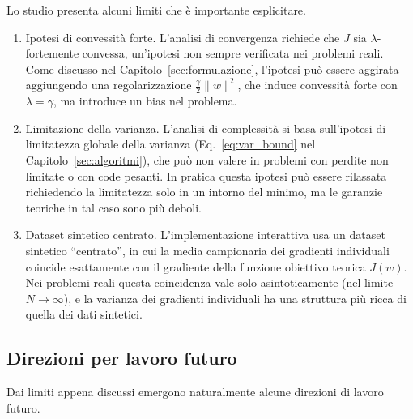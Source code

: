 \documentclass[a4paper,12pt]{article}
\numberwithin{equation}{section}
\numberwithin{figure}{section}
\numberwithin{table}{section}
\begin{document}
Lo studio presenta alcuni limiti che è importante esplicitare.

\begin{enumerate}\setlength{\itemsep}{1pt}\setlength{\topsep}{3pt}\setlength{\parskip}{0pt}
  \item Ipotesi di convessità forte. L'analisi di convergenza richiede
  che $J$ sia $\lambda$-fortemente convessa, un'ipotesi non sempre verificata
  nei problemi reali. Come discusso
  nel Capitolo~\ref{sec:formulazione}, l'ipotesi può essere aggirata
  aggiungendo una regolarizzazione $\frac{\gamma}{2}\|w\|^2$, che induce
  convessità forte con $\lambda = \gamma$, ma introduce un bias nel problema.
  \item Limitazione della varianza. L'analisi di complessità si basa
  sull'ipotesi di limitatezza globale della varianza
  (Eq.~\eqref{eq:var_bound} nel Capitolo~\ref{sec:algoritmi}), che può non
  valere in problemi con perdite non limitate o con code pesanti. In pratica
  questa ipotesi può essere rilassata richiedendo la limitatezza solo in un
  intorno del minimo, ma le garanzie teoriche in tal caso sono più deboli.
  \item Dataset sintetico centrato. L'implementazione interattiva usa
  un dataset sintetico ``centrato'', in cui la media campionaria dei gradienti
  individuali coincide esattamente con il gradiente della funzione
  obiettivo teorica $J(w)$. Nei problemi reali questa coincidenza vale solo
  asintoticamente (nel limite $N \to \infty$), e la varianza dei gradienti
  individuali ha una struttura più ricca di quella dei dati sintetici.
\end{enumerate}

\subsection{Direzioni per lavoro futuro}

Dai limiti appena discussi emergono naturalmente alcune direzioni di lavoro
futuro.
\end{document}
